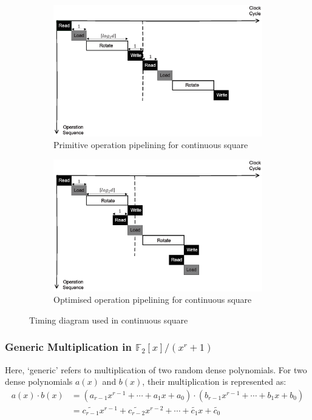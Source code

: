\documentclass[runningheads]{llncs}
\begin{document}
\begin{figure}[!tb]
\centering
\begin{subfigure}[t]{0.45\textwidth}\centering
\includegraphics[width=\textwidth]{./fig/pipeline_square.eps}
\caption{Primitive operation pipelining for continuous square}
\label{fig:pipeline_squ}
\end{subfigure}
\hspace{1em}
\begin{subfigure}[t]{0.45\textwidth}\centering
\includegraphics[width=\textwidth]{./fig/pipeline_square2.eps}
\caption{Optimised operation pipelining for continuous square }
\label{fig:pipeline_squ2}
\end{subfigure}
\caption{Timing diagram used in continuous square}
\end{figure}


\subsubsection{Generic Multiplication in $\mathbb{F}_2[x]/(x^r+1)$} Here, `generic' refers to multiplication of two random dense polynomials. 
For two dense polynomials $a(x)$ and $b(x)$, their multiplication is represented as:
\begin{align}
    a(x)\cdot b(x) &= (a_{r-1}x^{r-1}+\cdots + a_{1}x + a_0)\cdot(b_{r-1}x^{r-1}+\cdots + b_{1}x + b_0)\\
    &= \widetilde{c_{r-1}}x^{r-1}+\widetilde{c_{r-2}}x^{r-2}+\cdots + \widetilde{c_{1}}x +\widetilde{c_0}
\end{align}
\end{document}
